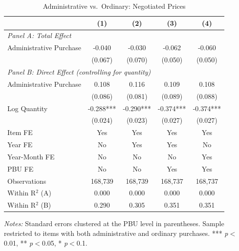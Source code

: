 \begin{table}[ht]
  \centering
  \caption{Administrative vs.\ Ordinary: Negotiated Prices}
  \label{tab:v8_adm_neg_prices}
  \small
  \begin{threeparttable}
  \begin{tabular}{lcccc}
    \hline\hline
    & (1) & (2) & (3) & (4) \\
    \hline
    \multicolumn{5}{l}{\textit{Panel A: Total Effect}} \\[3pt]
    Administrative Purchase & -0.040 & -0.030 & -0.062 & -0.060 \\
     & (0.067) & (0.070) & (0.050) & (0.050) \\[3pt]
    \hline
    \multicolumn{5}{l}{\textit{Panel B: Direct Effect (controlling for quantity)}} \\[3pt]
    Administrative Purchase & 0.108 & 0.116 & 0.109 & 0.108 \\
     & (0.086) & (0.081) & (0.089) & (0.088) \\[3pt]
    Log Quantity & -0.288*** & -0.290*** & -0.374*** & -0.374*** \\
     & (0.024) & (0.023) & (0.027) & (0.027) \\[3pt]
    \hline
    Item FE & Yes & Yes & Yes & Yes \\
    Year FE & No & Yes & Yes & No \\
    Year-Month FE & No & No & No & Yes \\
    PBU FE & No & No & Yes & Yes \\
    Observations & 168,739 & 168,739 & 168,737 & 168,737 \\
    Within R$^2$ (A) & 0.000 & 0.000 & 0.000 & 0.000 \\
    Within R$^2$ (B) & 0.290 & 0.305 & 0.351 & 0.351 \\
    \hline\hline
  \end{tabular}
  \begin{tablenotes}
    \small
    \item \textit{Notes:} Standard errors clustered at the PBU level in parentheses. Sample restricted to items with both administrative and ordinary purchases. *** \textit{p}$<$0.01, ** \textit{p}$<$0.05, * \textit{p}$<$0.1.
  \end{tablenotes}
  \end{threeparttable}
\end{table}
